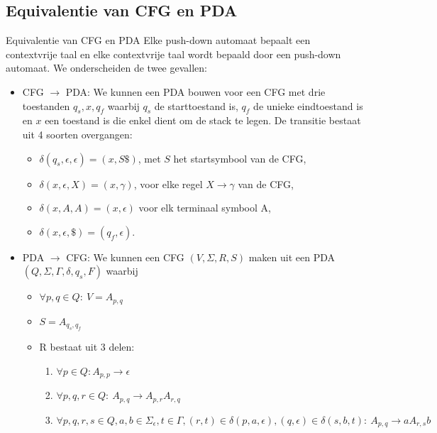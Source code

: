 \subsection{Equivalentie van CFG en PDA}

\vspace{0.5cm}

\begin{lem}{Equivalentie van CFG en PDA}
    Elke push-down automaat bepaalt een contextvrije taal en elke contextvrije taal wordt bepaald door een push-down automaat. We onderscheiden de twee gevallen:
    \begin{itemize}
        \item CFG $\to$ PDA: 
        We kunnen een PDA bouwen voor een CFG met drie toestanden $q_s,x,q_f$ waarbij $q_s$ de starttoestand is, $q_f$ de unieke eindtoestand is en $x$ een toestand is die enkel dient om de stack te legen. De transitie bestaat uit 4 soorten overgangen:
        \begin{itemize}
            \item $\delta(q_s, \epsilon, \epsilon) = (x, S\$)$, met $S$ het startsymbool van de CFG,
            \item $\delta(x, \epsilon, X) = (x, \gamma)$, voor elke regel $X \to \gamma$ van de CFG, 
            \item $\delta(x,A,A) = (x, \epsilon)$ voor elk terminaal symbool A,
            \item $\delta(x, \epsilon, \$) = (q_f, \epsilon)$.
        \end{itemize}
        \item PDA $\to$ CFG: 
        We kunnen een CFG $(V, \Sigma, R, S)$ maken uit een PDA $(Q,\Sigma,\Gamma,\delta,q_s,F)$ waarbij
        \begin{itemize}
            \item $\forall p,q \in Q: \ V = A_{p,q}$
            \item $S = A_{q_s,q_f}$
            \item 
                R bestaat uit 3 delen:
                \begin{enumerate}
                    \item $\forall p \in Q: A_{p,p} \to \epsilon$
                    \item $\forall p,q,r \in Q: \ A_{p,q} \to A_{p,r}A_{r,q}$
                    \item $\forall p,q,r,s \in Q, a,b \in \Sigma_{\epsilon}, t \in \Gamma, (r,t) \in \delta(p,a,\epsilon),(q,\epsilon) \in \delta(s,b,t): \ A_{p,q} \to aA_{r,s}b$
                \end{enumerate}
        \end{itemize}
    \end{itemize}
\end{lem}

